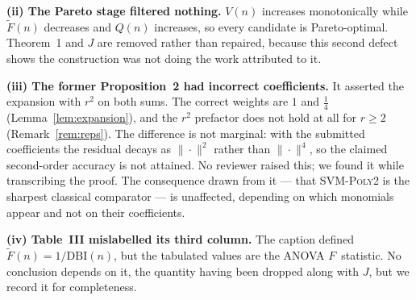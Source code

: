 \textbf{(ii) The Pareto stage filtered nothing.} $V(n)$ increases monotonically
while $\widetilde{F}(n)$ decreases and $Q(n)$ increases, so every candidate is
Pareto-optimal. Theorem~1 and $J$ are removed rather than repaired, because this
second defect shows the construction was not doing the work attributed to it.

\textbf{(iii) The former Proposition~2 had incorrect coefficients.} It asserted
the expansion with $r^{2}$ on both sums. The correct weights are $1$ and
$\tfrac{1}{4}$ (Lemma~\ref{lem:expansion}), and the $r^{2}$ prefactor does not hold
at all for $r\ge2$ (Remark~\ref{rem:reps}). The difference is not marginal: with
the submitted coefficients the residual decays as $\|\cdot\|^{2}$ rather than
$\|\cdot\|^{4}$, so the claimed second-order accuracy is not attained. No reviewer
raised this; we found it while transcribing the proof. The consequence drawn
from it --- that SVM-\textsc{Poly2} is the sharpest classical comparator --- is
unaffected, depending on which monomials appear and not on their coefficients.

\textbf{(iv) Table~III mislabelled its third column.} The caption defined
$\widetilde{F}(n)=1/\mathrm{DBI}(n)$, but the tabulated values are the ANOVA
$F$~statistic. No conclusion depends on it, the quantity having been dropped
along with $J$, but we record it for completeness.
